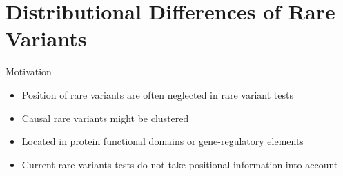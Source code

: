 \documentclass{beamer}
\begin{document}
\section{Distributional Differences of Rare Variants}

\begin{frame}[t]{Motivation}
  \begin{itemize}
    \item Position of rare variants are often neglected in rare variant tests
    \item Causal rare variants might be clustered
    \item Located in protein functional domains or gene-regulatory elements
    \item Current rare variants tests do not take positional information into account
  \end{itemize} 
  
\end{frame}
\end{document}

